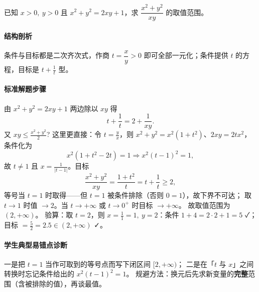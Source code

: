 \begin{problem}
已知 $x>0,\ y>0$ 且 $x^2+y^2=2xy+1$，求 $\dfrac{x^2+y^2}{xy}$ 的取值范围。
\end{problem}
\begin{solution}
\paragraph{结构剖析}
条件与目标都是二次齐次式，作商 $t=\dfrac xy>0$ 即可全部一元化；条件提供
$t$ 的方程，目标是 $t+\frac1t$ 型。
\paragraph{标准解题步骤}
由 $x^2+y^2=2xy+1$ 两边除以 $xy$ 得
\[
  t+\frac1t=2+\frac1{xy}.
\]
又 $xy\le\frac{x^2+y^2}{2}$? 这里更直接：令 $t=\frac yx$，则
$x^2+y^2=x^2(1+t^2)$、$2xy=2tx^2$，条件化为
\[
  x^2(1+t^2-2t)=1\Rightarrow x^2(t-1)^2=1,
\]
故 $t\neq1$ 且 $x=\frac1{|t-1|}$。目标
\[
  \frac{x^2+y^2}{xy}=\frac{1+t^2}{t}=t+\frac1t\ge2,
\]
等号当 $t=1$ 时取得——但 $t=1$ 被条件排除（否则 $0=1$），故下界不可达；
取 $t\to1$ 时值 $\to2$。当 $t\to+\infty$ 或 $t\to0^+$ 时目标 $\to+\infty$。
故取值范围为 $(2,+\infty)$。
验算：取 $t=2$，则 $x=\frac1{1}=1,\ y=2$：条件 $1+4=2\cdot2+1=5$ ✓；
目标 $=\frac{5}{2}=2.5\in(2,+\infty)$ ✓。
\paragraph{学生典型易错点诊断}
一是把 $t=1$ 当作可取到的等号点而写下闭区间 $[2,+\infty)$；
二是在「$t$ 与 $x$」之间转换时忘记条件给出的 $x^2(t-1)^2=1$。
规避方法：换元后先求新变量的\textbf{完整}范围（含被排除的值），再谈最值。
\end{solution}
